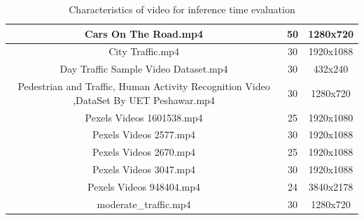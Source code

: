 \documentclass[twoside]{ctuthesis}
\theoremstyle{plain}
\theoremstyle{definition}
\theoremstyle{note}
\begin{document}
\begin{table}[]
{\begin{tabular}{|c|c|c|}
Cars On The Road.mp4                                                                  & 50                                                                            & 1280x720                                                            \\ \hline
City Traffic.mp4                                                                      & 30                                                                            & 1920x1088                                                           \\ \hline
Day Traffic Sample Video Dataset.mp4                                                  & 30                                                                            & 432x240                                                             \\ \hline
Pedestrian and Traffic, Human Activity Recognition Video ,DataSet By UET Peshawar.mp4 & 30                                                                            & 1280x720                                                            \\ \hline
Pexels Videos 1601538.mp4                                                             & 25                                                                            & 1920x1080                                                           \\ \hline
Pexels Videos 2577.mp4                                                                & 30                                                                            & 1920x1088                                                           \\ \hline
Pexels Videos 2670.mp4                                                                & 25                                                                            & 1920x1088                                                           \\ \hline
Pexels Videos 3047.mp4                                                                & 30                                                                            & 1920x1088                                                           \\ \hline
Pexels Videos 948404.mp4                                                              & 24                                                                            & 3840x2178                                                           \\ \hline
moderate\_traffic.mp4                                                                 & 30                                                                            & 1280x720                                                            \\ \hline
\end{tabular}
}
\caption{Characteristics of video for inference time evaluation}
	\label{video_characteristics}
\end{table}
\end{document}
